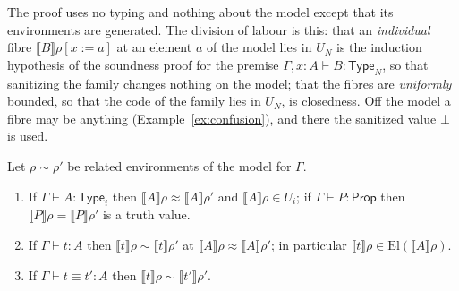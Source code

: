 \documentclass[10pt]{article}
\newcommand{\Prop}{\mathsf{Prop}}
\newcommand{\Type}{\mathsf{Type}}
\newcommand{\sem}[1]{\llbracket #1\rrbracket}
\newcommand{\El}{\mathrm{El}}
\begin{document}
The proof uses no typing and nothing about the model except that its
environments are generated. The division of labour is this: that an
\emph{individual} fibre $\sem B\rho[x{:=}a]$ at an element $a$ of the
model lies in $U_N$ is the induction hypothesis of the soundness proof
for the premise $\Gamma,x{:}A\vdash B:\Type_N$, so that sanitizing the
family changes nothing on the model; that the fibres are
\emph{uniformly} bounded, so that the code of the family lies in $U_N$,
is closedness. Off the model a fibre may be anything
(Example~\ref{ex:confusion}), and there the sanitized value $\bot$ is
used.

\begin{lemma}[soundness]\label{lem:sound}
Let $\rho\sim\rho'$ be related environments of the model for $\Gamma$.
\begin{enumerate}
\item If $\Gamma\vdash A:\Type_i$ then $\sem A\rho\approx\sem A\rho'$ and
  $\sem A\rho\in U_i$; if $\Gamma\vdash P:\Prop$ then $\sem P\rho=\sem P\rho'$
  is a truth value.
\item If $\Gamma\vdash t:A$ then $\sem t\rho\sim\sem t\rho'$ at
  $\sem A\rho\approx\sem A\rho'$; in particular $\sem t\rho\in\El(\sem A\rho)$.
\item If $\Gamma\vdash t\equiv t':A$ then $\sem t\rho\sim\sem{t'}\rho'$.
\end{enumerate}
\end{lemma}
\end{document}
